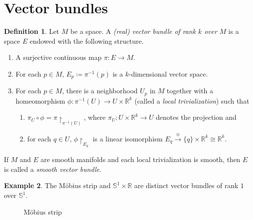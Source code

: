 \documentclass[10pt,letterpaper,cm]{nupset}
\theoremstyle{definition}
\newtheorem{definition}{Definition}[subsection]
\newtheorem{exmp}[definition]{Example}
\theoremstyle{theorem}
\theoremstyle{remark}
\newcommand{\R}{\mathbb R}
\renewcommand{\S}{\mathbb S}
\newcommand{\1}{\mathbf{1}}
\newcommand{\0}{\vec 0}
\begin{document}
\section{Vector bundles}

\begin{definition}
Let $M$ be a space. A \textit{(real) vector bundle of rank $k$ over $M$} is a space $E$ endowed with the following structure.
\begin{enumerate}[label=(\Roman*)]
\item A surjective continuous map $\pi : E \to M$.
\item For each $p \in M$, $E_p\coloneqq  \pi^{-1}(p)$ is a $k$-dimensional vector space.
\item For each $p\in M$, there is a neighborhood $U_p$ in $M$ together with a homeomorphism $\phi :\pi^{-1}(U) \to U \times \R^k$ (called a \textit{local trivialization}) such that
\begin{enumerate}
\item $\pi_U \circ \phi  = \pi \restriction_{\pi^{-1}(U)}$, where $\pi_U : U \times \R^k \to U$ denotes the projection and
\item for each $q\in U$, $\phi \restriction_{E_q}$ is a linear isomorphism $E_q \overset{\cong}{\longrightarrow} \{q\} \times \R^k \cong \R^k.$
\end{enumerate}
\end{enumerate}
If $M$ and $E$ are smooth manifolds and each local trivialization  is smooth, then $E$ is called a \textit{smooth vector bundle}.
\end{definition}

\begin{exmp}
The M\"obius strip and $\S^1 \times \R$ are distinct vector bundles of rank $1$ over $\S^1$.

\begin{figure}[h]
\centering
{}
\caption{M\"obius strip} 
\end{figure}

\end{exmp}
\end{document}
